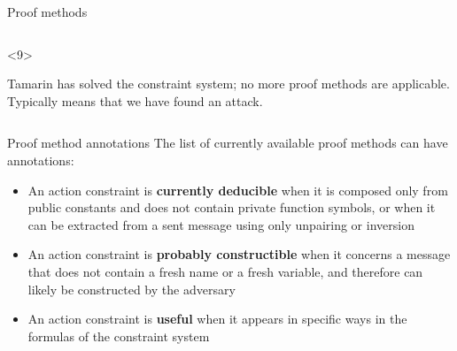 \documentclass[11pt,aspectratio=169]{beamer}
\begin{document}
\begin{frame}[fragile]{Proof methods}
\begin{columns}[T]
\begin{column}{0.45\textwidth}
            \begin{onlyenv}<9>
                \begin{tcolorbox}[
                    title = {\fontfamily{pcr}\fontseries{b}\selectfont SOLVED},
                    left = 1mm,
                    top = 1mm,
                    right = 1mm,
                    bottom = 1mm,
                ]
                    Tamarin has solved the constraint system; no more proof 
                    methods are applicable. Typically means that we have found 
                    an attack.
                \end{tcolorbox}
            \end{onlyenv}
        \end{column}
    \end{columns}
\end{frame}

\begin{frame}[fragile]{Proof method annotations}
    The list of currently available proof methods can have annotations:
    \begin{itemize}
        \item An action constraint is \textbf{currently deducible} when it is 
              composed only from public constants and does not contain private 
              function symbols, or when it can be extracted from a sent message 
              using only unpairing or inversion
        \item An action constraint is \textbf{probably constructible} when it 
              concerns a message that does not contain a fresh name or a fresh 
              variable, and therefore can likely be constructed by the adversary
        \item An action constraint is \textbf{useful} when it appears in 
              specific ways in the formulas of the constraint system
    \end{itemize}
\end{frame}
\end{document}

